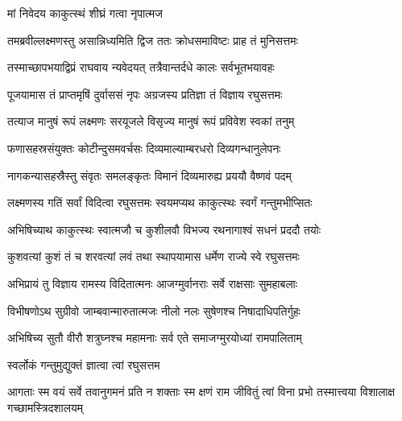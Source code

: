\onelineshloka
{मां निवेदय काकुत्स्थं शीघ्रं गत्वा नृपात्मज}%


\twolineshloka
{तमब्रवील्लक्ष्मणस्तु असान्निध्यमिति द्विज}
{ततः क्रोधसमाविष्टः प्राह तं मुनिसत्तमः}%




\twolineshloka
{तस्माच्छापभयाद्विप्रं राघवाय न्यवेदयत्}
{तत्रैवान्तर्दधे कालः सर्वभूतभयावहः}%

\twolineshloka
{पूजयामास तं प्राप्तमृषिं दुर्वाससं नृपः}
{अग्रजस्य प्रतिज्ञा तं विज्ञाय रघुसत्तमः}%

\twolineshloka
{तत्याज मानुषं रूपं लक्ष्मणः सरयूजले}
{विसृज्य मानुषं रूपं प्रविवेश स्वकां तनुम्}%

\twolineshloka
{फणासहस्रसंयुक्तः कोटीन्दुसमवर्चसः}
{दिव्यमाल्याम्बरधरो दिव्यगन्धानुलेपनः}%

\twolineshloka
{नागकन्यासहस्रैस्तु संवृतः समलङ्कृतः}
{विमानं दिव्यमारुह्य प्रययौ वैष्णवं पदम्}%

\twolineshloka
{लक्ष्मणस्य गतिं सर्वां विदित्वा रघुसत्तमः}
{स्वयमप्यथ काकुत्स्थः स्वर्गं गन्तुमभीप्सितः}%

\twolineshloka
{अभिषिच्याथ काकुत्स्थः स्वात्मजौ च कुशीलवौ}
{विभज्य रथनागाश्वं सधनं प्रददौ तयोः}%

\twolineshloka
{कुशवत्यां कुशं तं च शरवत्यां लवं तथा}
{स्थापयामास धर्मेण राज्ये स्वे रघुसत्तमः}%

\twolineshloka
{अभिप्रायं तु विज्ञाय रामस्य विदितात्मनः}
{आजग्मुर्वानराः सर्वे राक्षसाः सुमहाबलाः}%

\twolineshloka
{विभीषणोऽथ सुग्रीवो जाम्बवान्मारुतात्मजः}
{नीलो नलः सुषेणश्च निषादाधिपतिर्गुहः}%

\twolineshloka
{अभिषिच्य सुतौ वीरौ शत्रुघ्नश्च महामनाः}
{सर्व एते समाजग्मुरयोध्यां रामपालिताम्}%



\onelineshloka
{स्वर्लोकं गन्तुमुद्युक्तं ज्ञात्वा त्वां रघुसत्तम}%


\threelineshloka
{आगताः स्म वयं सर्वे तवानुगमनं प्रति}
{न शक्ताः स्म क्षणं राम जीवितुं त्वां विना प्रभो}
{तस्मात्त्वया विशालाक्ष गच्छामस्त्रिदशालयम्}%



